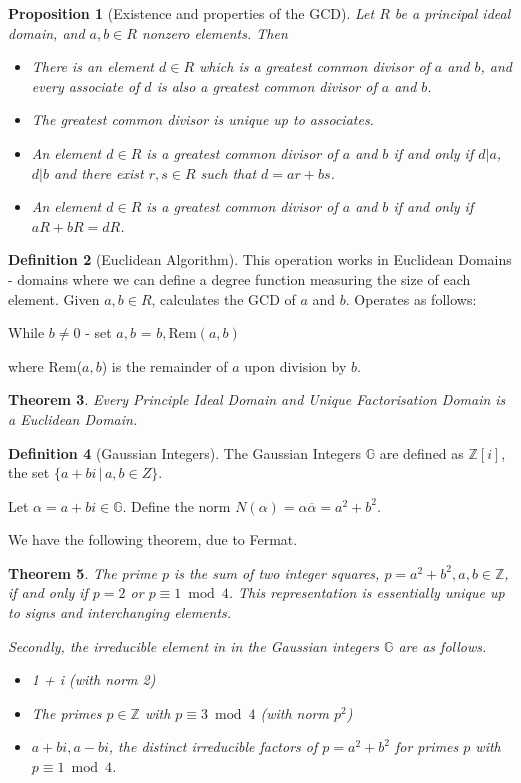 \documentclass[10pt, oneside, reqno]{amsart}
\theoremstyle{plain}%
\newtheorem{thm}{Theorem}[section]
\newtheorem{prop}[thm]{Proposition}
\theoremstyle{definition}
\newtheorem{defn}[thm]{Definition}
\theoremstyle{remark}
\newcommand{\al}{\alpha}
\newcommand{\Z}{\mathbb{Z}}
\newcommand{\Ga}{\mathbb{G}}
\begin{document}
\begin{prop}[Existence and properties of the GCD]
	Let $R$ be a principal ideal domain, and $a,b \in R$ nonzero elements.  Then
	\begin{itemize}
		\item There is an element $d \in R$ which is a greatest common divisor of $a$ and $b$, and every associate of $d$ is also a greatest common divisor of $a$ and $b$.
		\item The greatest common divisor is unique up to associates.
		\item An element $d \in R$ is a greatest common divisor of $a$ and $b$ if and only if $d | a$, $d|b$ and there exist $r,s \in R$ such that $d = ar + bs$.  
		\item An element $d \in R$ is a greatest common divisor of $a$ and $b$ if and only if $aR + bR = dR$. 
	\end{itemize}
\end{prop}


\begin{defn}[Euclidean Algorithm]
	This operation works in Euclidean Domains - domains where we can define a degree function measuring the size of each element.
	Given $a,b \in R$, calculates the GCD of $a$ and $b$.  Operates as follows:
	
	While $b \neq 0$ - set $a,b$ = $b, \text{Rem}(a,b)$
	
	where Rem($a,b$) is the remainder of $a$ upon division by $b$.
\end{defn}

\begin{thm}
	Every Principle Ideal Domain and Unique Factorisation Domain is a Euclidean Domain.
\end{thm}



\begin{defn}[Gaussian Integers]
	The Gaussian Integers $\Ga$ are defined as $\Z[i]$, the set $\{ a + b i \, | \, a, b \in Z \}$.
\end{defn}

Let $\alpha = a + bi \in \Ga$. Define the norm $N(\alpha) = \al \overline{\al} = a^2 + b^2$.  

We have the following theorem, due to Fermat.

\begin{thm}
	The prime $p$ is the sum of two integer squares, $p = a^2 + b^2, a,b \in \Z$, if and only if $p = 2$ or $p \equiv 1 \bmod 4$.  This representation is essentially unique up to signs and interchanging elements.
	
	Secondly, the irreducible element in in the Gaussian integers $\Ga$ are as follows.
	\begin{itemize}
		\item 1 + i (with norm 2)
		\item The primes $p \in \Z$ with $p \equiv 3 \bmod 4$ (with norm $p^2$)
		\item $a + bi, a-bi$, the distinct irreducible factors of $p = a^2 + b^2$ for primes $p$ with $p \equiv 1 \bmod 4$.
	\end{itemize} 
\end{thm}
\end{document}
